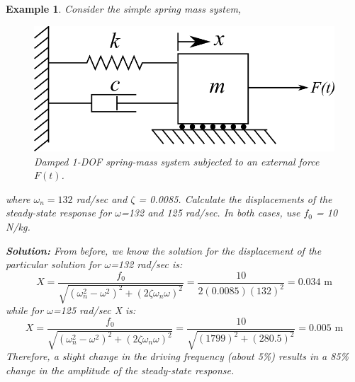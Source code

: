 \documentclass[12pt,letter]{article}
\newtheorem{ex}{Example}
\numberwithin{ex}{section} %
\newenvironment{example}{\begin{mdframed}[middlelinewidth=0.5mm]\begin{ex}\normalfont}{\end{ex}\end{mdframed}}
\numberwithin{re}{section} %
\begin{document}
			
			
\begin{example}

			Consider the simple spring mass system, 
			\begin{figure}[H]
				\centering
				\includegraphics[]{../Figures/1-DOF-spring_dashpot_mass_horizontal_forced.png}
				\caption{Damped 1-DOF spring-mass system subjected to an external force $F(t)$.}
			\end{figure}				
			where $\omega_n = 132$ rad/sec and $\zeta$ = 0.0085. Calculate the displacements of the steady-state response for $\omega$=132 and 125 rad/sec. In both cases, use $f_0$ = 10 N/kg. 

			\noindent\textbf{Solution:}	From before, we know the solution for the displacement of the particular solution for $\omega$=132 rad/sec is:
			\begin{equation}
				X = \frac{f_0}{\sqrt{(\omega_n^2 - \omega^2)^2 +  (2\zeta \omega_n \omega)^2}} = \frac{10}{2(0.0085)(132)^2} = 0.034 \text{ m}
			\end{equation}							
			while for $\omega$=125 rad/sec X is:
			\begin{equation}
				X = \frac{f_0}{\sqrt{(\omega_n^2 - \omega^2)^2 +  (2\zeta \omega_n \omega)^2}} = \frac{10}{\sqrt{(1799)^2 +  (280.5)^2}}  = 0.005 \text{ m}
			\end{equation}				
			Therefore, a slight change in the driving frequency (about 5\%) results in a 85\% change in the amplitude of the steady-state response. 
\end{example}
\end{document}
